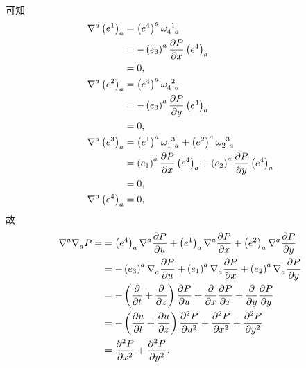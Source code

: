 \begin{xiti}
\begin{zm}
\begin{align*}
		\end{align*}
		可知
		\begin{equation*}
			\begin{split}
				\tensor{\nabla}{^a} \tensor{\left( e^1 \right)}{_a} &= \tensor{\left( e^4 \right)}{^a} \tensor{\omega}{_4^1_a}\\
				&= - \tensor{\left( e_3 \right)}{^a} \pdv{P}{x} \tensor{\left( e^4 \right)}{_a}\\
				&= 0,\\
				\tensor{\nabla}{^a} \tensor{\left( e^2 \right)}{_a} &= \tensor{\left( e^4 \right)}{^a} \tensor{\omega}{_4^2_a}\\
				&= - \tensor{\left( e_3 \right)}{^a} \pdv{P}{y} \tensor{\left( e^4 \right)}{_a}\\
				&= 0,\\
				\tensor{\nabla}{^a} \tensor{\left( e^3 \right)}{_a} &= \tensor{\left( e^1 \right)}{^a} \tensor{\omega}{_1^3_a} + \tensor{\left( e^2 \right)}{^a} \tensor{\omega}{_2^3_a}\\
				&= \tensor{\left( e_1 \right)}{^a} \pdv{P}{x} \tensor{\left( e^4 \right)}{_a} + \tensor{\left( e_2 \right)}{^a} \pdv{P}{y} \tensor{\left( e^4 \right)}{_a}\\
				&= 0,\\
				\tensor{\nabla}{^a} \tensor{\left( e^4 \right)}{_a} &= 0,
			\end{split}
		\end{equation*}
		故
		\begin{align*}
			\tensor{\nabla}{^a} \tensor{\nabla}{_a} P =&= \tensor{\left( e^4 \right)}{_a} \tensor{\nabla}{^a} \pdv{P}{u} + \tensor{\left( e^1 \right)}{_a} \tensor{\nabla}{^a} \pdv{P}{x} + \tensor{\left( e^2 \right)}{_a} \tensor{\nabla}{^a} \pdv{P}{y}\\
			&= - \tensor{\left( e_3 \right)}{^a} \tensor{\nabla}{_a} \pdv{P}{u} + \tensor{\left( e_1 \right)}{^a} \tensor{\nabla}{_a} \pdv{P}{x} + \tensor{\left( e_2 \right)}{^a} \tensor{\nabla}{_a} \pdv{P}{y}\\
			&= - \left( \pdv{t} + \pdv{z} \right) \pdv{P}{u} + \pdv{x} \pdv{P}{x} + \pdv{y} \pdv{P}{y}\\
			&= - \left( \pdv{u}{t} + \pdv{u}{z} \right) \pdv[2]{P}{u} + \pdv[2]{P}{x} + \pdv[2]{P}{y}\\
			&= \pdv[2]{P}{x} + \pdv[2]{P}{y}.
		\end{align*}
	\end{zm}
\end{xiti}